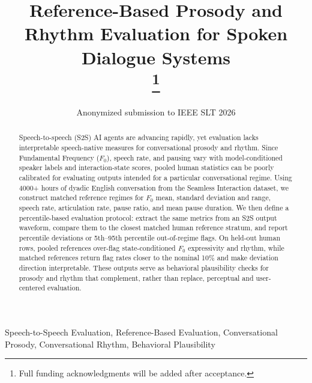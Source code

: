 \documentclass[conference]{IEEEtran}
\begin{document}
\title{Reference-Based Prosody and Rhythm Evaluation for Spoken Dialogue Systems\\
\thanks{Full funding acknowledgments will be added after acceptance.}
}

\author{Anonymized submission to IEEE SLT 2026}

\maketitle

\begin{abstract}
Speech-to-speech (S2S) AI agents are advancing rapidly, yet evaluation lacks interpretable speech-native measures for conversational prosody and rhythm. 
Since Fundamental Frequency ($F_0$), speech rate, and pausing vary with model-conditioned speaker labels and interaction-state scores, pooled human statistics can be poorly calibrated for evaluating outputs intended for a particular conversational regime.
Using 4000+ hours of dyadic English conversation from the Seamless Interaction dataset, we construct matched reference regimes for $F_0$ mean, standard deviation and range, speech rate, articulation rate, pause ratio, and mean pause duration.
We then define a percentile-based evaluation protocol: extract the same metrics from an S2S output waveform, compare them to the closest matched human reference stratum, and report percentile deviations or 5th--95th percentile out-of-regime flags.
On held-out human rows, pooled references over-flag state-conditioned $F_0$ expressivity and rhythm, while matched references return flag rates closer to the nominal 10\% and make deviation direction interpretable.
These outputs serve as behavioral plausibility checks for prosody and rhythm that complement, rather than replace, perceptual and user-centered evaluation.
\end{abstract}

\begin{IEEEkeywords}
Speech-to-Speech Evaluation, Reference-Based Evaluation, Conversational Prosody, Conversational Rhythm, Behavioral Plausibility
\end{IEEEkeywords}
\end{document}
